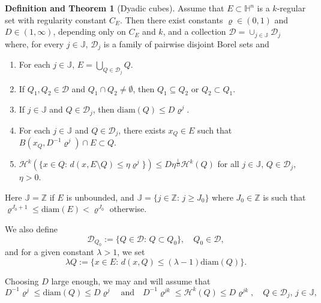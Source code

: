 \documentclass[12pt]{amsart}
\renewcommand{\rho}{\varrho}
\numberwithin{equation}{section}
\theoremstyle{plain}
\theoremstyle{definition}
\newtheorem{definitionT}[theorem]{Definition and Theorem}
\theoremstyle{remark}
\begin{document}
\begin{definitionT}[Dyadic cubes] \label{dt:dyad}
    Assume that $E\subset \mathbb{H}^n$ is a $k$-regular set with regularity constant $C_E$. 
    Then there exist constants $\varrho \in (0,1)$ and $D\in (1,\infty)$, depending only on $C_E$ and $k$, and a collection $\mathcal{D}=\cup_{j\in \mathbb{J}}\mathcal{D}_j$ where, for every $j\in\mathbb J$, $\mathcal D_j$ is a family of pairwise disjoint Borel sets and 
    \begin{enumerate}
        \item For each $j\in \mathbb{J}$, $E=\bigcup_{Q\in \mathcal{D}_j}Q$.
        \item If $Q_1,Q_2 \in \mathcal{D}$ and $Q_1\cap Q_2\neq \emptyset$, then $Q_1 \subseteq Q_2$ or $Q_2\subset Q_1$.
        \item If $j\in \mathbb{J}$ and $Q\in \mathcal{D}_j$, then $\mathrm{diam}(Q)\leq D \varrho^{j}$.
        \item For each $j\in \mathbb{J}$ and $Q\in \mathcal{D}_j$, there exists $x_Q\in E$ such that $B(x_Q,D^{-1}\rho^{j})\cap E \subset Q$.
        \item $\mathcal{H}^k(\{x\in Q:\, d(x,E\setminus Q)\leq \eta \varrho^j\})\leq D \eta^{\frac{1}{D}}\mathcal{H}^k(Q)$ for all $j\in \mathbb{J}$, $Q\in \mathcal{D}_j$, $\eta>0$.
    \end{enumerate}
 Here $\mathbb{J}=\mathbb{Z}$ if $E$ is unbounded, and  $\mathbb{J}=\{j\in \mathbb{Z}:\,j\geq J_0\}$ where $J_0 \in \mathbb{Z}$ is such that $
    \rho^{J_0+1}\leq \mathrm{diam}(E)<
    \rho^{J_0}$ otherwise.
     
 We also define
    \begin{displaymath}
        \mathcal{D}_{Q_0}:=\{Q\in \mathcal{D}:\,Q\subset Q_0\},\quad Q_0\in \mathcal{D},
    \end{displaymath}
    and for a given constant $\lambda>1$, we set
    \begin{displaymath}
        \lambda Q:= \{x\in E:\, d(x,Q)\leq (\lambda-1)\mathrm{diam}(Q)\}.
    \end{displaymath}
\end{definitionT}
Choosing $D$ large enough, we may and will assume that
\begin{equation}\label{eq:H_(14)}
    D^{-1}\rho^j \leq \mathrm{diam}(Q)\leq D \rho^j \quad \text{and}\quad D^{-1}\rho^{jk}\leq \mathcal{H}^k(Q)\leq D\rho^{jk},\quad Q\in \mathcal{D}_j,\,j\in \mathbb{J},
    \end{equation}
\end{document}

